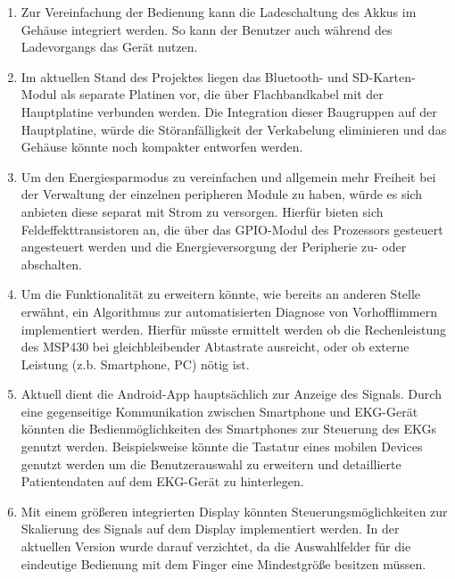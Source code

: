 \begin{enumerate}

\item Zur Vereinfachung der Bedienung kann die Ladeschaltung des Akkus im Gehäuse integriert werden. So kann der Benutzer auch während des Ladevorgangs das Gerät nutzen.

\item Im aktuellen Stand des Projektes liegen das Bluetooth- und SD-Karten-Modul als separate Platinen vor, die über Flachbandkabel mit der Hauptplatine verbunden werden. Die Integration dieser Baugruppen auf der Hauptplatine, würde die Störanfälligkeit der Verkabelung eliminieren und das Gehäuse könnte noch kompakter entworfen werden.

\item Um den Energiesparmodus zu vereinfachen und allgemein mehr Freiheit bei der Verwaltung der einzelnen peripheren Module zu haben, würde es sich anbieten diese separat mit Strom zu versorgen. Hierfür bieten sich Feldeffekttransistoren an, die über das GPIO-Modul des Prozessors gesteuert angesteuert werden und die Energieversorgung der Peripherie zu- oder abschalten.

\item Um die Funktionalität zu erweitern könnte, wie bereits an anderen Stelle erwähnt, ein Algorithmus zur automatisierten Diagnose von Vorhofflimmern implementiert werden. Hierfür müsste ermittelt werden ob die Rechenleistung des MSP430 bei gleichbleibender Abtastrate ausreicht, oder ob externe Leistung (z.b. Smartphone, PC) nötig ist.

\item Aktuell dient die Android-App hauptsächlich zur Anzeige des Signals. Durch eine gegenseitige Kommunikation zwischen Smartphone und EKG-Gerät könnten die Bedienmöglichkeiten des Smartphones zur Steuerung des EKGs genutzt werden. Beispielsweise könnte die Tastatur eines mobilen Devices genutzt werden um die Benutzerauswahl zu erweitern und detaillierte Patientendaten auf dem EKG-Gerät zu hinterlegen.

\item Mit einem größeren integrierten Display könnten Steuerungsmöglichkeiten zur Skalierung des Signals auf dem Display implementiert werden. In der aktuellen Version wurde darauf verzichtet, da die Auswahlfelder für die eindeutige Bedienung mit dem Finger eine Mindestgröße besitzen müssen.

\end{enumerate}